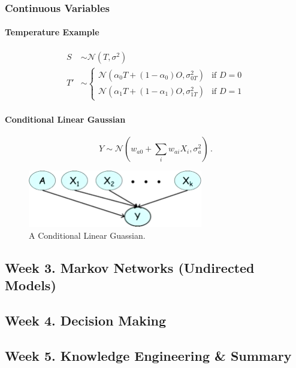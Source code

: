 \documentclass[12pt]{article}
\begin{document}
\subsubsection{Continuous Variables}

\paragraph{Temperature Example}
\begin{align*}
  S & \sim \mathcal{N}(T, \sigma^2) \\
  T' & \sim 
    \begin{cases}
      \mathcal{N}(\alpha_0 T + (1-\alpha_0)O, \sigma_{0T}^2) & \text{if } D = 0 \\
      \mathcal{N}(\alpha_1 T + (1-\alpha_1)O, \sigma_{1T}^2) & \text{if } D = 1
    \end{cases}
\end{align*}

\paragraph{Conditional Linear Gaussian}

\begin{equation*}
  Y \sim \mathcal{N} \left( w_{a0} + \sum_i w_{ai} X_i, \sigma_a^2 \right) \, .
\end{equation*}

\begin{figure}[H]
\centering
\includegraphics[width=3in]{graphics/conditional_linear_gaussian.png}
\caption{A Conditional Linear Guassian.}
\label{fig:conditional_linear_gaussian}
\end{figure}


\subsection{Week 3. Markov Networks (Undirected Models)}


\subsection{Week 4. Decision Making}


\subsection{Week 5. Knowledge Engineering \& Summary}
\end{document}
